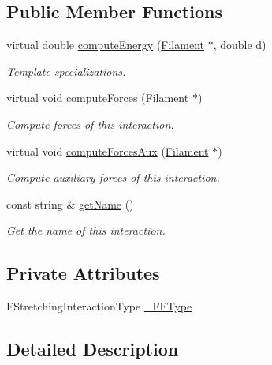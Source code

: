 \subsection*{Public Member Functions}
\begin{DoxyCompactItemize}
\item 
virtual double \hyperlink{classFilamentStretching_a462a1347e413e6182c6ab036cd59ce21}{compute\+Energy} (\hyperlink{classFilament}{Filament} $\ast$, double d)
\begin{DoxyCompactList}\small\item\em Template specializations. \end{DoxyCompactList}\item 
virtual void \hyperlink{classFilamentStretching_a9eb09772eefd993fe0adbbb0d45e74df}{compute\+Forces} (\hyperlink{classFilament}{Filament} $\ast$)
\begin{DoxyCompactList}\small\item\em Compute forces of this interaction. \end{DoxyCompactList}\item 
virtual void \hyperlink{classFilamentStretching_a54e9d089bc365723488df4103346b5f0}{compute\+Forces\+Aux} (\hyperlink{classFilament}{Filament} $\ast$)
\begin{DoxyCompactList}\small\item\em Compute auxiliary forces of this interaction. \end{DoxyCompactList}\item 
const string \& \hyperlink{classFilamentInteractions_af3c391f24ffbb7088de189cdb209d650}{get\+Name} ()
\begin{DoxyCompactList}\small\item\em Get the name of this interaction. \end{DoxyCompactList}\end{DoxyCompactItemize}
\subsection*{Private Attributes}
\begin{DoxyCompactItemize}
\item 
F\+Stretching\+Interaction\+Type \hyperlink{classFilamentStretching_adbac4d42333a286d19b98f9147f259a9}{\+\_\+\+F\+F\+Type}
\end{DoxyCompactItemize}


\subsection{Detailed Description}
